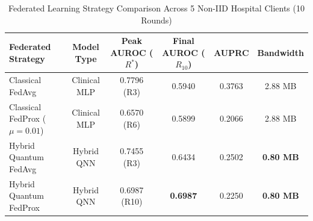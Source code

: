 \begin{table}[t]
\centering
\caption{Federated Learning Strategy Comparison Across 5 Non-IID Hospital Clients (10 Rounds)}
\label{tab:federated_comparison}
\begin{tabular}{lccccc}
\hline
\textbf{Federated Strategy} & \textbf{Model Type} & \textbf{Peak AUROC ($R^*$)} & \textbf{Final AUROC ($R_{10}$)} & \textbf{AUPRC} & \textbf{Bandwidth} \\
\hline
Classical FedAvg & Clinical MLP & 0.7796 (R3) & 0.5940 & 0.3763 & 2.88 MB \\
Classical FedProx ($\mu=0.01$) & Clinical MLP & 0.6570 (R6) & 0.5899 & 0.2066 & 2.88 MB \\
Hybrid Quantum FedAvg & Hybrid QNN & 0.7455 (R3) & 0.6434 & 0.2502 & \textbf{0.80 MB} \\
Hybrid Quantum FedProx & Hybrid QNN & 0.6987 (R10) & \textbf{0.6987} & 0.2250 & \textbf{0.80 MB} \\
\hline
\end{tabular}
\end{table}
